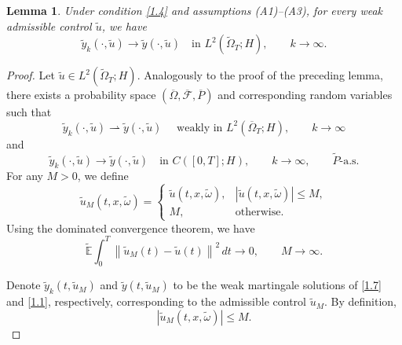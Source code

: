 \documentclass[a4paper,12pt]{article}
\newtheorem{lemma}[definition]{Lemma}
\numberwithin{equation}{section}
\begin{document}
\begin{lemma}\label{lem:3.3}
Under condition \eqref{1.4} and assumptions \textnormal{(A1)--(A3)},
for every weak admissible control $\widetilde{u}$, we have
\begin{equation}
\widetilde{y}_k(\cdot,\widetilde{u})
\longrightarrow
\widetilde{y}(\cdot,\widetilde{u})
\quad\text{in }
L^2(\widetilde{\Omega}_T;H),
\qquad k\to\infty.
\label{3.11}
\end{equation}
\end{lemma}
\begin{proof}
Let $\widetilde{u}\in L^2(\widetilde{\Omega}_T;H)$. Analogously to
the proof of the preceding lemma, there exists a probability space
$(\overline{\Omega},\overline{\mathcal{F}},\overline{P})$ and
corresponding random variables such that
\begin{equation}\label{3.12}
\tilde{y}_k(\cdot,\tilde{u})
\rightharpoonup
\tilde{y}(\cdot,\tilde{u})
\quad\text{ weakly in }
L^2(\overline{\Omega}_T;H),
\qquad k\to\infty
\end{equation}
and
\begin{equation}
\widetilde{y}_k(\cdot,\widetilde{u})
\longrightarrow
\widetilde{y}(\cdot,\widetilde{u})
\quad\text{in }C([0,T];H),
\qquad k\to\infty,
\qquad \widetilde{P}\text{-a.s.}
\label{3.13}
\end{equation}
For any $M>0$, we define
\begin{equation}
\widetilde{u}_M(t,x,\widetilde{\omega})
=
\begin{cases}
\widetilde{u}(t,x,\widetilde{\omega}),
& \left|\widetilde{u}(t,x,\widetilde{\omega})\right|\leq M,\\
M,
& \text{otherwise}.
\end{cases}
\label{3.14}
\end{equation}
Using the dominated convergence theorem, we have
\begin{equation}
\widetilde{\mathbb{E}}
\int_0^T
\left\|
\widetilde{u}_M(t)-\widetilde{u}(t)
\right\|^2\,dt
\longrightarrow 0,
\qquad M\to\infty.
\label{3.15}
\end{equation}

Denote $\widetilde{y}_k(t,\widetilde{u}_M)$ and
$\widetilde{y}(t,\widetilde{u}_M)$ to be the weak martingale solutions of
\eqref{1.7} and \eqref{1.1}, respectively, corresponding to the
admissible control $\widetilde{u}_M$. By definition,
\[
\left|
\widetilde{u}_M(t,x,\widetilde{\omega})
\right|
\leq M.
\]


\end{proof}
\end{document}
